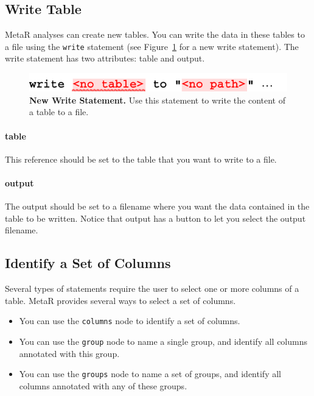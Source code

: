 \subsection{Write Table}
MetaR analyses can create new tables. You can write the data in these tables to a file using the \texttt{write} statement (see Figure~\ref{fig:NewWriteTableStatement} for a new write statement). The write statement has two attributes: table and output.
\begin{figure}
  \centering
  \includegraphics[width=\figWidthNarrow]{figures/NewWriteStatement.pdf}
\caption[New Write Statement	.]{\textbf{New Write Statement.} Use this statement to write the content of a table to a file.}
\label{fig:NewWriteTableStatement}
\end{figure}


\paragraph{table}
This reference should be set to the table that you want to write to a file.
\paragraph{output}
The output should be set to a filename where you want the data contained in the table to be written. Notice that output has a button to let you select the output filename.

\subsection{Identify a Set of Columns}\label{subsec:KeySelectionDescription}
Several types of statements require the user to select one or more columns of a table. MetaR provides several ways to select a set of columns. 
\begin{itemize}
  \item You can use the \texttt{columns} node to identify a set of columns. 
  \item You can use the \texttt{group} node to name a single group, and identify all columns annotated with this group.
  \item You can use the \texttt{groups} node to name a set of groups, and identify all columns annotated with any of these groups.
\end{itemize}

